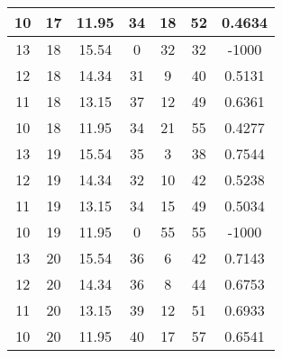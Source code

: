 \documentclass[letterpaper, 12pt]{article}
\begin{document}
\begin{longtable}{|c|c|c|c|c|c|c|}
\hline
10 & 17 & 11.95 & 34 & 18 & 52 & 0.4634 \\
\hline
13 & 18 & 15.54 & 0 & 32 & 32 & -1000 \\
\hline
12 & 18 & 14.34 & 31 & 9 & 40 & 0.5131 \\
\hline
11 & 18 & 13.15 & 37 & 12 & 49 & 0.6361 \\
\hline
10 & 18 & 11.95 & 34 & 21 & 55 & 0.4277 \\
\hline
13 & 19 & 15.54 & 35 & 3 & 38 & 0.7544 \\
\hline
12 & 19 & 14.34 & 32 & 10 & 42 & 0.5238 \\
\hline
11 & 19 & 13.15 & 34 & 15 & 49 & 0.5034 \\
\hline
10 & 19 & 11.95 & 0 & 55 & 55 & -1000 \\
\hline
13 & 20 & 15.54 & 36 & 6 & 42 & 0.7143 \\
\hline
12 & 20 & 14.34 & 36 & 8 & 44 & 0.6753 \\
\hline
11 & 20 & 13.15 & 39 & 12 & 51 & 0.6933 \\
\hline
10 & 20 & 11.95 & 40 & 17 & 57 & 0.6541 \\
\hline
\end{longtable}
\end{document}
